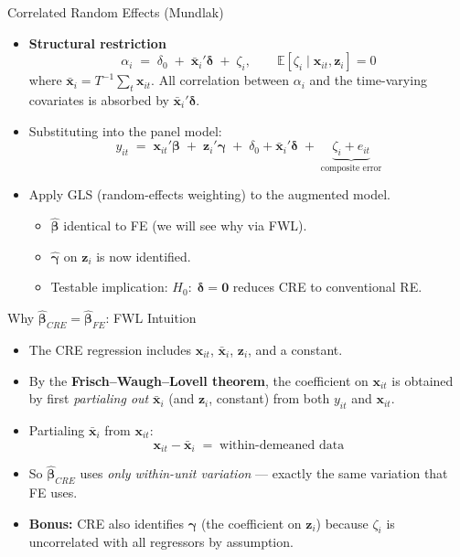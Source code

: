 \documentclass[aspectratio=169, handout, t]{beamer}
\numberwithin{equation}{section}
\begin{document}
\begin{frame}{Correlated Random Effects (Mundlak)}
\begin{itemize}
  \item \textbf{Structural restriction}
    \[
      \alpha_i \;=\; \delta_0 \;+\; \bar{\bm{x}}_{i}'\bm{\delta} \;+\; \zeta_i,
      \qquad \mathbb{E}[\zeta_i\mid\bm{x}_{it},\bm{z}_{i}]=0
    \]
    where $\bar{\bm{x}}_{i}= T^{-1}\!\sum_{t}\bm{x}_{it}$.
    All correlation between $\alpha_i$ and the time-varying covariates is
    absorbed by $\bar{\bm{x}}_{i}'\bm{\delta}$.\pause
  \item Substituting into the panel model:
    \[
      y_{it}
      \;=\;
      \bm{x}_{it}'\bm{\beta}
      \;+\;
      \bm{z}_{i}'\bm{\gamma}
      \;+\;
      \delta_0 + \bar{\bm{x}}_{i}'\bm{\delta}
      \;+\;
      \underbrace{\zeta_i + e_{it}}_{\text{composite error}}
    \]\pause
  \item Apply GLS (random-effects weighting) to the augmented model.
    \begin{itemize}
      \item $\hat{\bm{\beta}}$ identical to FE (we will see why via FWL).
      \item $\hat{\bm{\gamma}}$ on $\bm{z}_i$ is now identified.
      \item Testable implication:
        $H_0\!:\;\bm{\delta}=\bm{0}$ reduces CRE to conventional RE.
    \end{itemize}
\end{itemize}
\end{frame}

\begin{frame}{Why $\hat{\bm{\beta}}_{CRE} = \hat{\bm{\beta}}_{FE}$: FWL Intuition}
\begin{itemize}
  \item The CRE regression includes $\bm{x}_{it}$, $\bar{\bm{x}}_i$,
        $\bm{z}_i$, and a constant.
  \item By the \textbf{Frisch--Waugh--Lovell theorem}, the coefficient on
        $\bm{x}_{it}$ is obtained by first \emph{partialing out}
        $\bar{\bm{x}}_i$ (and $\bm{z}_i$, constant) from both $y_{it}$
        and $\bm{x}_{it}$.\pause
  \item Partialing $\bar{\bm{x}}_i$ from $\bm{x}_{it}$:
    \[
      \bm{x}_{it} - \bar{\bm{x}}_i
      \;=\; \text{within-demeaned data}
    \]
  \item So $\hat{\bm{\beta}}_{CRE}$ uses \emph{only within-unit variation}
        --- exactly the same variation that FE uses.\pause
  \item \textbf{Bonus:} CRE also identifies $\bm{\gamma}$ (the coefficient on
        $\bm{z}_i$) because $\zeta_i$ is uncorrelated with all regressors
        by assumption.
\end{itemize}
\end{frame}
\end{document}
